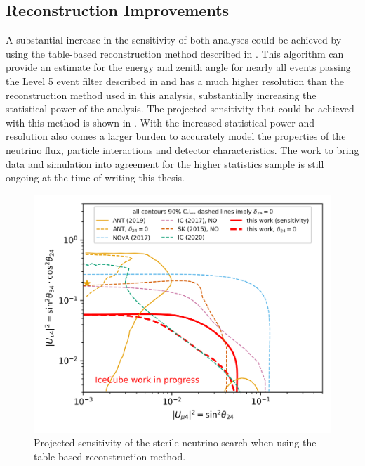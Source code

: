 \subsection{Reconstruction Improvements}
A substantial increase in the sensitivity of both analyses could be achieved by using the table-based reconstruction method described in \cite{lowen-reco-paper}.
This algorithm can provide an estimate for the energy and zenith angle for nearly all events passing the Level 5 event filter described in  and has a much higher resolution than the reconstruction method used in this analysis, substantially increasing the statistical power of the analysis.
The projected sensitivity that could be achieved with this method is shown in . With the increased statistical power and resolution also comes a larger burden to accurately model the properties of the neutrino flux, particle interactions and detector characteristics. The work to bring data and simulation into agreement for the higher statistics sample is still ongoing at the time of writing this thesis.
\begin{figure}
    \centering
    \includegraphics[width=0.9\linewidth]{figures/summary/Sterile_mixing_sensitivity_90pct_retro.png}
    \caption{Projected sensitivity of the sterile neutrino search when using the table-based reconstruction method.\label{fig:retro-sensitivity}}
\end{figure}

